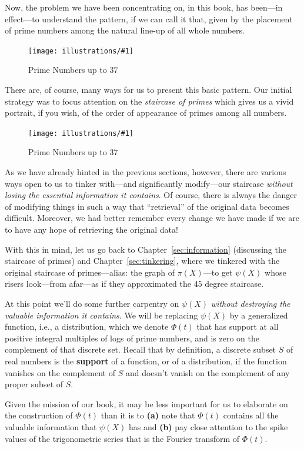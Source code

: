 \documentclass[openany]{book}
\newcommand{\ill}[3]{%
   \begin{figure}[H]%
   \vspace{-2ex}
   \centering%
   \texttt{[image: illustrations/\#1]}%
   \caption{#3}%
   \vspace{-2ex}
    \end{figure}}
\theoremstyle{plain}
\theoremstyle{definition}
\begin{document}
  Now, the problem we have been concentrating on, in this book, has
  been---in effect---to understand the pattern, if we can call it
  that, given by the placement of prime numbers among the natural
  line-up of all whole numbers.
\ill{primes_line}{1}{Prime Numbers up to $37$}

 There are, of course, many ways for us to present this basic
 pattern. Our initial strategy was to focus attention on the {\it
   staircase of primes} which gives us a vivid portrait, if you wish,
 of the order of appearance of primes among all numbers.
\ill{PN_38}{.45}{Prime Numbers up to $37$}

 As we have already hinted in the previous sections, however, there
 are various ways open to us to tinker with---and significantly
 modify---our staircase {\it without losing the essential information
   it contains}. Of course, there is always the danger of modifying
 things in such a way that ``retrieval'' of the original data becomes
 difficult.  Moreover, we had better remember every change we have
 made if we are to have any hope of retrieving the original data!

 With this in mind, let us go back to Chapter~\ref{sec:information}
 (discussing the staircase of primes) and Chapter~\ref{sec:tinkering},
 where we tinkered with the original staircase of primes---alias: the
 graph of $\pi(X)$---to get $\psi(X)$ whose risers look---from
 afar---as if they approximated the 45 degree staircase.%


   At this point we'll do some further carpentry on $\psi(X)$ {\it without destroying the valuable
   information it contains}. We will be replacing  $\psi(X)$ by a generalized function, i.e., a
   distribution, which we denote $\Phi(t)$ that has support at all positive integral multiples
     of logs of prime numbers, and is  zero on the complement of that discrete set.  Recall that
     by definition, a discrete subset $S$ of real numbers is  the  {\bf support} of a function,
     or of a distribution, if the function vanishes on the complement of  $S$ and doesn't vanish
     on the complement of any proper subset of $S$.

   Given the mission of our book, it may be less important for us to  elaborate on  the construction
   of  $\Phi(t)$  than it is to {\bf (a)} note that $\Phi(t)$  contains all the valuable information
   that  $\psi(X)$ has and {\bf (b)} pay close attention to the spike values of the trigonometric
   series that is the Fourier transform of $\Phi(t)$.
\end{document}
